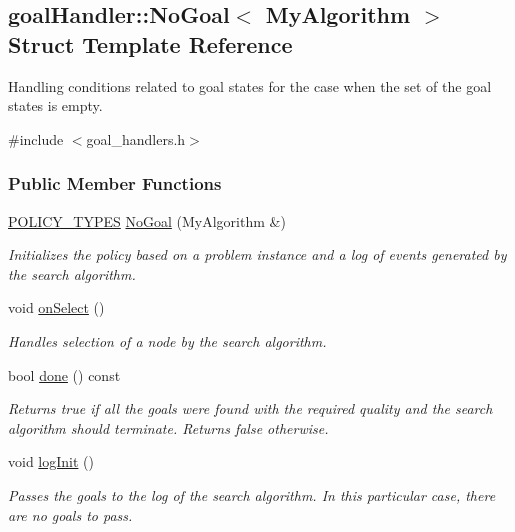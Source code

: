 \hypertarget{structgoalHandler_1_1NoGoal}{}\subsection{goal\+Handler\+:\+:No\+Goal$<$ My\+Algorithm $>$ Struct Template Reference}
\label{structgoalHandler_1_1NoGoal}


Handling conditions related to goal states for the case when the set of the goal states is empty.  




{\ttfamily \#include $<$goal\+\_\+handlers.\+h$>$}

\subsubsection*{Public Member Functions}
\begin{DoxyCompactItemize}
\item 
\hyperlink{extensions_2shared__policies_2headers_8h_ae70a06fa4631780beea14971eb36a562}{P\+O\+L\+I\+C\+Y\+\_\+\+T\+Y\+P\+ES} \hyperlink{structgoalHandler_1_1NoGoal_a7b4eae101886ca887f44d5c646f1c822}{No\+Goal} (My\+Algorithm \&)\hypertarget{structgoalHandler_1_1NoGoal_a7b4eae101886ca887f44d5c646f1c822}{}\label{structgoalHandler_1_1NoGoal_a7b4eae101886ca887f44d5c646f1c822}

\begin{DoxyCompactList}\small\item\em Initializes the policy based on a problem instance and a log of events generated by the search algorithm. \end{DoxyCompactList}\item 
void \hyperlink{structgoalHandler_1_1NoGoal_aa72ad4ddb56ad479ffdb73ac6b2c9c63}{on\+Select} ()\hypertarget{structgoalHandler_1_1NoGoal_aa72ad4ddb56ad479ffdb73ac6b2c9c63}{}\label{structgoalHandler_1_1NoGoal_aa72ad4ddb56ad479ffdb73ac6b2c9c63}

\begin{DoxyCompactList}\small\item\em Handles selection of a node by the search algorithm. \end{DoxyCompactList}\item 
bool \hyperlink{structgoalHandler_1_1NoGoal_a4751bfc3e2aa72499ca4e97aa4bd6851}{done} () const 
\begin{DoxyCompactList}\small\item\em Returns {\ttfamily true} if all the goals were found with the required quality and the search algorithm should terminate. Returns {\ttfamily false} otherwise. \end{DoxyCompactList}\item 
void \hyperlink{structgoalHandler_1_1NoGoal_aa9f7144c46443a5bba887a756ae438cb}{log\+Init} ()
\begin{DoxyCompactList}\small\item\em Passes the goals to the log of the search algorithm. In this particular case, there are no goals to pass. \end{DoxyCompactList}\end{DoxyCompactItemize}


